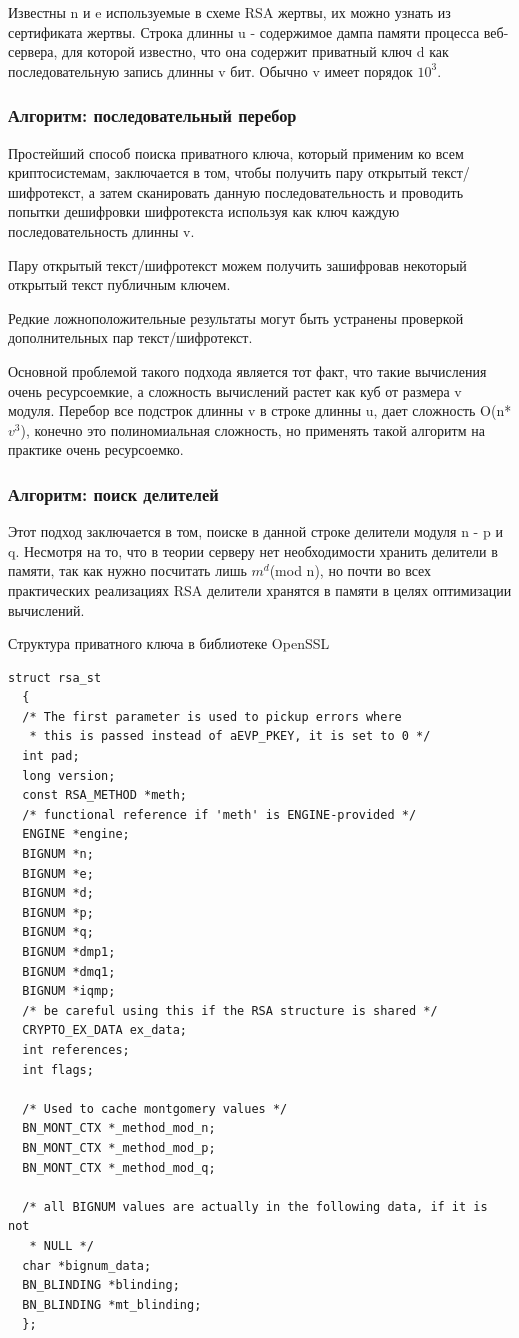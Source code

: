 \documentclass[20pt]{article}
\begin{document}
Известны n и e используемые в схеме RSA жертвы, их можно узнать из сертификата
жертвы. Строка длинны u - содержимое дампа памяти процесса веб-сервера, для
которой известно, что она содержит приватный ключ d как последовательную запись
длинны v бит. Обычно v имеет порядок $10^3$.

\subsubsection{Алгоритм: последовательный перебор}

Простейший способ поиска приватного ключа, который применим ко всем
криптосистемам, заключается в том, чтобы получить пару открытый текст/шифротекст,
а затем сканировать данную последовательность и проводить попытки дешифровки
шифротекста используя как ключ каждую последовательность длинны v.

Пару открытый текст/шифротекст можем получить зашифровав некоторый открытый текст
публичным ключем.

Редкие ложноположительные результаты могут быть устранены проверкой
дополнительных пар текст/шифротекст.

Основной проблемой такого подхода является тот факт, что такие вычисления очень
ресурсоемкие, а сложность вычислений растет как куб от размера v модуля.
Перебор все подстрок длинны v в строке длинны u, дает сложность O(n*$v^3$),
конечно это полиномиальная сложность, но применять такой алгоритм на практике
очень ресурсоемко.

\subsubsection{Алгоритм: поиск делителей}

Этот подход заключается в том, поиске в данной строке делители модуля n - p и q.
Несмотря на то, что в теории серверу нет необходимости хранить делители в
памяти, так как нужно посчитать лишь $m^d$(mod n), но почти во всех практических
реализациях RSA делители хранятся в памяти в целях оптимизации вычислений.

Структура приватного ключа в библиотеке OpenSSL
\label{rsa}
\begin{lstlisting}
struct rsa_st
  {
  /* The first parameter is used to pickup errors where
   * this is passed instead of aEVP_PKEY, it is set to 0 */
  int pad;
  long version;
  const RSA_METHOD *meth;
  /* functional reference if 'meth' is ENGINE-provided */
  ENGINE *engine;
  BIGNUM *n;
  BIGNUM *e;
  BIGNUM *d;
  BIGNUM *p;
  BIGNUM *q;
  BIGNUM *dmp1;
  BIGNUM *dmq1;
  BIGNUM *iqmp;
  /* be careful using this if the RSA structure is shared */
  CRYPTO_EX_DATA ex_data;
  int references;
  int flags;

  /* Used to cache montgomery values */
  BN_MONT_CTX *_method_mod_n;
  BN_MONT_CTX *_method_mod_p;
  BN_MONT_CTX *_method_mod_q;

  /* all BIGNUM values are actually in the following data, if it is not
   * NULL */
  char *bignum_data;
  BN_BLINDING *blinding;
  BN_BLINDING *mt_blinding;
  };
\end{lstlisting}
\end{document}
